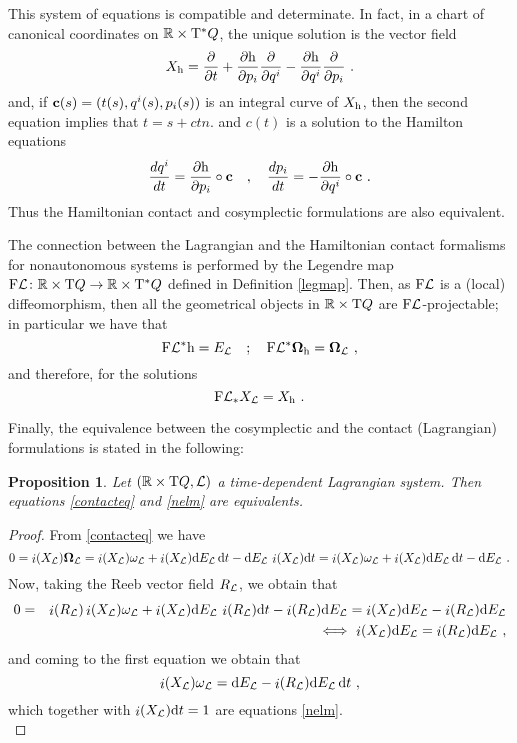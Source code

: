 \documentclass[12pt]{report}
\newtheorem{prop}[teor]{Proposition}
\def\beann{\begin{eqnarray*}}
\def\eeann{\end{eqnarray*}}
\def\derpar#1#2{\frac{\partial{#1}}{\partial{#2}}}
\def\qed{\ifvmode\removelastskip\fi
{\unskip\nobreak\hfil\penalty50\hbox{}\nobreak\hfil
\hbox{\vrule height1.2ex width1.2ex}\parfillskip=0pt
\finalhyphendemerits=0 \par\smallskip}}
\def\Lag{{\cal L}}
\def\d{{\rm d}}
\def\Real{\mathbb{R}}
\def\Tan{{\rm T}}
\def\inn{\mathop{i}\nolimits}
\begin{document}
This system of equations is compatible and determinate.
In fact, in a chart of canonical coordinates  on $\Real\times\Tan^*Q$,
the unique solution is the vector field
$$
X_{\rm h} =\derpar{}{t}+ \derpar{{\rm h}}{p_i} \derpar{}{q^i} -
      \derpar{{\rm h}}{q^i} \derpar{}{p_i} \ .
$$
and, if ${\bf c}(s)=(t(s),q^i(s), p_i(s))$ is an integral curve of $X_{\rm h}$,
then the second equation implies that $t=s+ctn.$ and $c(t)$
is a solution to the Hamilton equations
\[
\frac{dq^i}{dt} = \frac{\partial {\rm h}}{\partial p_i}\circ{\bf c} \quad ,\quad 
\frac{dp_i}{dt}= -\frac{\partial {\rm h}}{\partial q^i}\circ{\bf c}\ .
\]
Thus the Hamiltonian contact and cosymplectic formulations are also equivalent. 

The connection between the Lagrangian and the
Hamiltonian contact formalisms for nonautonomous systems is performed by the Legendre map
${\rm F}\Lag\colon\Real\times\Tan Q \to \Real\times\Tan^*Q$
defined in Definition \ref{legmap}.
Then, as ${\rm F}\Lag$  is a (local) diffeomorphism,
then all the geometrical objects in
$\Real\times\Tan Q$ are ${\rm F}\Lag$-projectable;
in particular we have that
$$
{\rm F}\Lag^*{\rm h}=E_\Lag \quad ; \quad
{\rm F}\Lag^*\mbox{\boldmath $\Omega$}_{\rm h} =\mbox{\boldmath $\Omega$}_{\cal L} \ ,
$$
and therefore, for the solutions
$$
{\rm F}\Lag_*X_{\cal L} = X_{\rm h} \ .
$$

Finally, the equivalence between the cosymplectic and the contact (Lagrangian) formulations is stated in the following:

\begin{prop}
Let $(\Real\times\Tan Q,\Lag)$ a time-dependent Lagrangian system.
Then equations \eqref{contacteq} and \eqref{nelm} are equivalents.
\end{prop}
\begin{proof}
From \eqref{contacteq} we have
$$
0=\inn(X_{\cal L})\mbox{\boldmath $\Omega$}_\Lag =
\inn(X_{\cal L})\omega_\Lag+ \inn(X_{\cal L})\d E_\Lag\,\d t-
\d E_\Lag\, \inn(X_{\cal L})\d t=
\inn(X_{\cal L})\omega_\Lag+ \inn(X_{\cal L})\d E_\Lag\,\d t-
\d E_\Lag \ .
$$
Now, taking the Reeb vector field $R_\Lag$, we obtain that
\beann
0&=&\inn(R_\Lag)\inn(X_{\cal L})\omega_\Lag+ \inn(X_{\cal L})\d E_\Lag\,\inn(R_\Lag)\d t-\inn(R_\Lag)\d E_\Lag=
 \inn(X_{\cal L})\d E_\Lag-\inn(R_\Lag)\d E_\Lag \\
& &  \Longleftrightarrow \ \inn(X_{\cal L})\d E_\Lag=\inn(R_\Lag)\d E_\Lag \ ,
\eeann
and coming to the first equation we obtain that
$$
\inn(X_{\cal L})\omega_\Lag=
\d E_\Lag- \inn(R_{\cal L})\d E_\Lag\,\d t \ ,
$$
which together with $\inn(X_{\cal L})\d t=1$ are equations \eqref{nelm}.
\\ \qed\end{proof}
\end{document}
